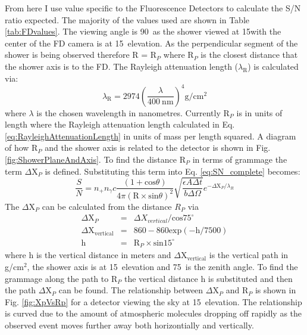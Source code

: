 From here I use value specific to the Fluorescence Detectors to calculate the S/N ratio expected. The majority of the values used are shown in Table \ref{tab:FDvalues}. The viewing angle is 90\textdegree \ as the shower viewed at 15\textdegree with the center of the FD camera is at 15\textdegree \ elevation. As the perpendicular segment of the shower is being observed therefore R = R$_P$ where R$_P$ is the closest distance that the shower axis is to the FD. The Rayleigh attenuation length ($\lambda_{\mathrm{R}}$) is calculated via:
\begin{equation}
\lambda_{\mathrm{R}} = 2974 \left(\frac{\lambda}{400 \ \mathrm{nm}} \right)^4 \mathrm{g}/\mathrm{cm}^2 \label{eq:RayleighAttenuationLength}
\end{equation}
where $\lambda$ is the chosen wavelength in nanometres. Currently R$_P$ is in units of length where the Rayleigh attenuation length calculated in Eq. \ref{eq:RayleighAttenuationLength} in units of mass per length squared. A diagram of how R$_P$ and the shower axis is related to the detector is shown in Fig. \ref{fig:ShowerPlaneAndAxis}. To find the distance R$_P$ in terms of grammage the term $\Delta$X$_P$ is defined. Substituting this term into Eq. \ref{eq:SN_complete} becomes:
\begin{equation}
\frac{S}{N} = n_+ n_{\gamma} c \frac{(1 + \mathrm{cos}\theta)}{4 \pi (\mathrm{R} \times \mathrm{sin}\theta)^2} \sqrt{\frac{\epsilon A \Delta t}{b \Delta\Omega}} e^{-\Delta \mathrm{X}_P / \lambda_R}
\end{equation}
The $\Delta$X$_P$ can be calculated from the distance $R_P$ via
\begin{eqnarray}
\Delta \mathrm{X}_P &=& \Delta X_{vertical} / \mathrm{cos}75^{\circ} \\
\Delta \mathrm{X}_{\mathrm{vertical}} &=& 860 - 860\mathrm{exp}(-\mathrm{h}/7500) \\
\mathrm{h} &=& \mathrm{R}_P \times \mathrm{sin}15^{\circ}
\end{eqnarray}
where h is the vertical distance in meters and $\Delta$X$_{\mathrm{vertical}}$ is the vertical path in g/cm$^2$, the shower axis is at 15\textdegree \ elevation and 75\textdegree \ is the zenith angle. To find the grammage along the path to R$_P$ the vertical distance h is substituted and then the path $\Delta$X$_P$ can be found. The relationship between $\Delta$X$_P$ and R$_P$ is shown in Fig. \ref{fig:XpVsRp} for a detector viewing the sky at 15\textdegree \ elevation. The relationship is curved due to the amount of atmospheric molecules dropping off rapidly as the observed event moves further away both horizontially and vertically.


